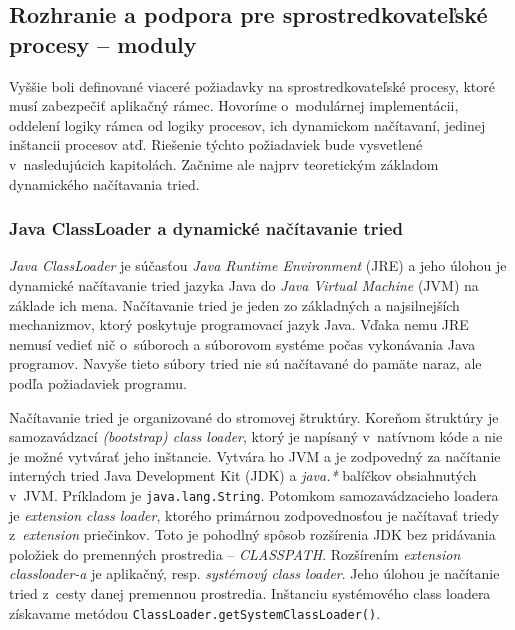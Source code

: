 
\subsection{Rozhranie a podpora pre sprostredkovateľské procesy -- moduly} \label{sec:intermediate_process}

Vyššie boli definované viaceré požiadavky na sprostredkovateľské procesy, ktoré musí zabezpečiť 
aplikačný rámec. Hovoríme o~modulárnej implementácii, oddelení logiky rámca od logiky procesov, 
ich dynamickom načítavaní, jedinej inštancii procesov atď. Riešenie týchto požiadaviek bude vysvetlené
v~nasledujúcich kapitolách. Začnime ale najprv teoretickým základom dynamického načítavania tried.

\subsubsection{Java ClassLoader a dynamické načítavanie tried} \label{sec:classLoader}

\emph{Java ClassLoader} je súčasťou \emph{Java Runtime Environment} (JRE) a jeho úlohou je dynamické
načítavanie tried jazyka Java do \emph{Java Virtual Machine} (JVM) na základe ich mena. 
Načítavanie tried je jeden zo základných a najsilnejších mechanizmov, ktorý poskytuje programovací jazyk
Java. Vďaka nemu JRE nemusí vedieť nič o~súboroch a súborovom systéme počas vykonávania Java programov. 
Navyše tieto súbory tried nie sú načítavané do pamäte naraz, ale podľa požiadaviek 
programu. \citep{mcmanis, travis}

Načítavanie tried je organizované do stromovej štruktúry. Koreňom štruktúry je samozavádzací 
\emph{(bootstrap) class loader}, ktorý je napísaný v~natívnom kóde a nie je možné vytvárať jeho inštancie. 
Vytvára ho 
JVM a je zodpovedný za načítanie interných tried Java Development Kit (JDK) a \emph{java.*} balíčkov 
obsiahnutých v~JVM. Príkladom je \verb|java.lang.String|. Potomkom samozavádzacieho loadera je 
\emph{extension class loader},
ktorého primárnou zodpovednosťou je načítavať triedy z~\emph{extension} priečinkov. Toto je pohodlný 
spôsob rozšírenia JDK bez pridávania položiek do premenných prostredia -- \emph{CLASSPATH}. 
Rozšírením \emph{extension classloader-a} je aplikačný, resp. \emph{systémový class loader}. Jeho úlohou 
je načítanie tried z~cesty danej premennou prostredia. Inštanciu systémového class loadera získavame 
metódou \verb|ClassLoader.getSystemClassLoader()|. \citep{techjava, antl}

